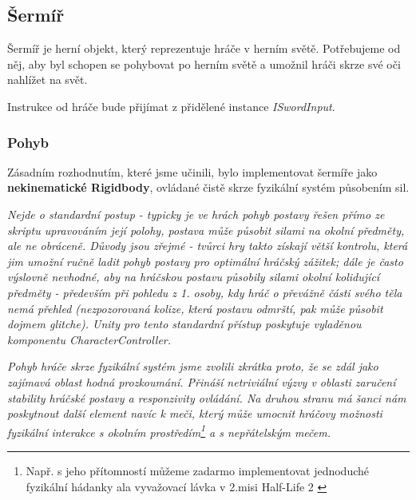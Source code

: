 \pagebreak



\subsection{Šermíř}

Šermíř je herní objekt, který reprezentuje hráče v herním světě. Potřebujeme od něj, aby byl schopen se pohybovat po herním světě a umožnil hráči skrze své oči nahlížet na svět. 

Instrukce od hráče bude přijímat z přidělené instance \textit{ISwordInput}.

\subsubsection*{Pohyb}

Zásadním rozhodnutím, které jsme učinili, bylo implementovat šermíře jako \textbf{nekinematické Rigidbody}, ovládané čistě skrze fyzikální systém působením sil. 

\textit{Nejde o standardní postup - typicky je ve hrách pohyb postavy řešen přímo ze skriptu upravováním její polohy, postava může působit silami na okolní předměty, ale ne obráceně. Důvody jsou zřejmé - tvůrci hry takto získají větší kontrolu, která jim umožní ručně ladit pohyb postavy pro optimální hráčský zážitek; dále je často výslovně nevhodné, aby na hráčskou postavu působily silami okolní kolidující předměty - především při pohledu z 1. osoby, kdy hráč o převážně části svého těla nemá přehled (nezpozorovaná kolize, která postavu odmrští, pak může působit dojmem glitche). Unity pro tento standardní přístup poskytuje vyladěnou komponentu CharacterController.}

\textit{Pohyb hráče skrze fyzikální systém jsme zvolili zkrátka proto, že se zdál jako zajímavá oblast hodná prozkoumání. Přináší netriviální výzvy v oblasti zaručení stability hráčské postavy a responzivity ovládání. Na druhou stranu má šanci nám poskytnout další element navíc k meči, který může umocnit hráčovy možnosti fyzikální interakce s okolním prostředím\footnote{Např. s jeho přítomností můžeme zadarmo implementovat jednoduché fyzikální hádanky ala vyvažovací lávka v 2.misi Half-Life 2 \cite{HalfLife2}} a s nepřátelským mečem.}


